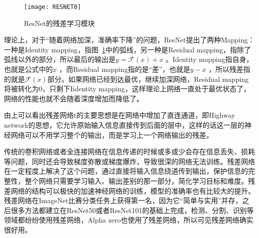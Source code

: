 \begin{figure}[!htbp]
    \centering
    \texttt{[image: RESNET0]}
    \caption{ResNet的残差学习模块}
    \label{fig9}
\end{figure}

理论上，对于“随着网络加深，准确率下降”的问题，ResNet提出了两种Mapping：一种是Identity mapping，指图~\ref{fig9}中的弧线，另一种是Residual mapping，指除了弧线以外的部分，所以最后的输出是$y=\mathcal{F}\left ( x \right )+x$ 。Identity mapping指自身，也就是公式中的$x$ ，而Residual mapping指的是“差”，也就是$y-x$ ，所以残差指的就是$\mathcal{F}\left (x \right )$部分。如果网络已经到达最优，继续加深网络，Residual mapping将被转化为0，只剩下Iidentity mapping，这样理论上网络一直处于最优状态了，网络的性能也就不会随着深度增加而降低了。

由上可以看出残差网络t的主要思想是在网络中增加了直连通道，即Highway network的思想，它允许原始输入信息直接传到后面的层中\citep{Srivastava2015Highway}，这样的话这一层的神经网络可以不用学习整个的输出，而是学习上一个网络输出的残差。


传统的卷积网络或者全连接网络在信息传递的时候或多或少会存在信息丢失、损耗等问题，同时还会导致梯度弥散或梯度爆炸，导致很深的网络无法训练。残差网络在一定程度上解决了这个问题，通过直接将输入信息绕道传到输出，保护信息的完整性，整个网络只需要学习输入、输出差别的那一部分，简化学习目标和难度。残差网络的结构可以极快的加速神经网络的训练，模型的准确率也有比较大的提升。残差网络在ImageNet比赛分类任务上获得第一名，因为它“简单与实用”并存，之后很多方法都建立在ResNet50或者ResNet101的基础上完成，检测、分割、识别等领域都纷纷使用残差网络，Alpha zero也使用了残差网络，所以可见残差网络确实很好用。
